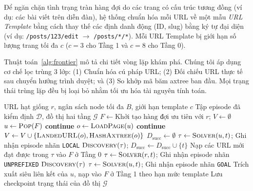 Để ngăn chặn tình trạng tràn hàng đợi do các trang có cấu trúc tương đồng (ví dụ: các bài viết trên diễn đàn), hệ thống chuẩn hóa mỗi URL về một mẫu \textit{URL Template} bằng cách thay thế các định danh động (ID, slug) bằng ký tự đại diện (ví dụ: \texttt{/posts/123/edit} $\rightarrow$ \texttt{/posts/*/*}). Mỗi URL Template bị giới hạn số lượng trang tối đa $c$ ($c = 3$ cho Tầng 1 và $c = 8$ cho Tầng 0).

Thuật toán~\ref{alg:frontier} mô tả chi tiết vòng lặp khám phá. Chúng tôi áp dụng cơ chế lọc trùng 3 lớp: (1) Chuẩn hóa cú pháp URL; (2) Đối chiếu URL thực tế sau chuyển hướng trình duyệt; và (3) So khớp mã băm axtree ban đầu. Mọi trạng thái trùng lặp đều bị loại bỏ nhằm tối ưu hóa tài nguyên tính toán.

\begin{algorithm}[H]
  \caption{Vòng lặp khám phá môi trường web có định hướng}
  \label{alg:frontier}
  \begin{algorithmic}[1]
    \Require URL hạt giống $r$, ngân sách node tối đa $B$, giới hạn template $c$
    \Ensure Tập episode đã kiểm định $\mathcal{D}$, đồ thị hai tầng $\mathcal{G}$
    \State $F \gets \text{Khởi tạo hàng đợi ưu tiên với } r$; \quad $V \gets \emptyset$
    \State $u \gets \textsc{Pop}(F)$ 
     \textbf{continue} \EndIf
    \State $o \gets \textsc{LoadPage}(u)$ 
     \textbf{continue} \EndIf
    \State $V \gets V \cup \{\textsc{LandedURL}(o), \textsc{HashAxtree}(o)\}$
    \State $D_{\text{succ}} \gets \emptyset$ 
     
    \State $\tau \gets \textsc{Solver}(u, t)$; \quad Ghi nhận episode nhãn \texttt{LOCAL}
    \State $\textsc{Discovery}(\tau)$; \quad $D_{\text{succ}} \gets D_{\text{succ}} \cup \{t\}$
    \EndIf
    \State Nạp các URL mới đạt được trong $\tau$ vào $F$ ở Tầng 0
    \EndFor
     
    \State $\tau \gets \textsc{Solver}(r, t)$; \quad Ghi nhận episode nhãn \texttt{UNPREFIXED}
     $\textsc{Discovery}(\tau)$ \EndIf
    \EndFor
     
    \State $\tau \gets \textsc{Solver}(u, t)$; \quad Ghi nhận episode nhãn \texttt{GOAL}
    \EndFor
    \State Trích xuất siêu liên kết của $u$, nạp vào $F$ ở Tầng 1 theo hạn mức template
    \State Lưu checkpoint trạng thái của đồ thị $\mathcal{G}$
    \EndWhile
  \end{algorithmic}
\end{algorithm}

